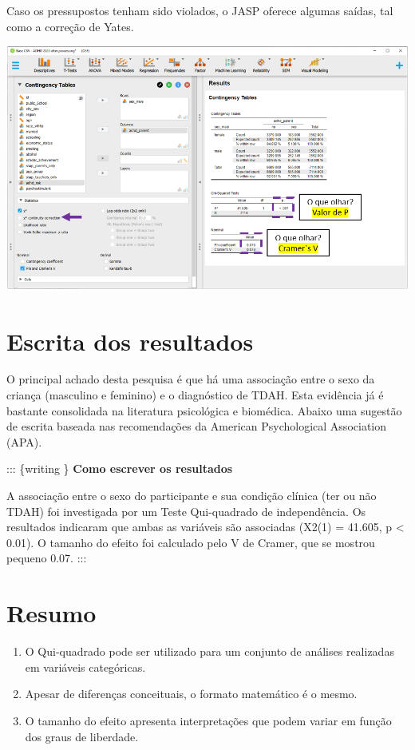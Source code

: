 \documentclass[
]{book}
\providecommand{\tightlist}{%
  \setlength{\itemsep}{0pt}\setlength{\parskip}{0pt}}
\begin{document}
Caso os pressupostos tenham sido violados, o JASP oferece algumas saídas, tal como a correção de Yates.

\includegraphics{./img/cap_x2_yates.png}

\hypertarget{escrita-dos-resultados}{%
\section{Escrita dos resultados}\label{escrita-dos-resultados}}

O principal achado desta pesquisa é que há uma associação entre o sexo da criança (masculino e feminino) e o diagnóstico de TDAH. Esta evidência já é bastante consolidada na literatura psicológica e biomédica. Abaixo uma sugestão de escrita baseada nas recomendações da American Psychological Association (APA).

::: \{writing \}
\textbf{Como escrever os resultados}

A associação entre o sexo do participante e sua condição clínica (ter ou não TDAH) foi investigada por um Teste Qui-quadrado de independência. Os resultados indicaram que ambas as variáveis são associadas (X2(1) = 41.605, p \textless{} 0.01). O tamanho do efeito foi calculado pelo V de Cramer, que se mostrou pequeno 0.07.
:::

\hypertarget{resumo-6}{%
\section{Resumo}\label{resumo-6}}

\begin{enumerate}
\def\labelenumi{\arabic{enumi}.}
\tightlist
\item
  O Qui-quadrado pode ser utilizado para um conjunto de análises realizadas em variáveis categóricas.\\
\item
  Apesar de diferenças conceituais, o formato matemático é o mesmo.\\
\item
  O tamanho do efeito apresenta interpretações que podem variar em função dos graus de liberdade.\\
\end{enumerate}
\end{document}
